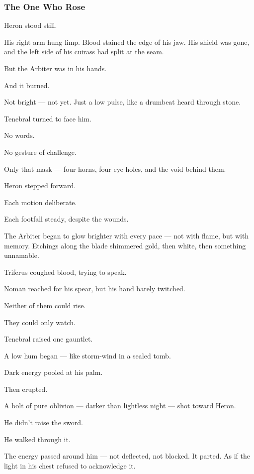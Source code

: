 \documentclass[12pt]{article}
\begin{document}
\dotfill

\subsubsection{The One Who Rose}

Heron stood still.

His right arm hung limp. Blood stained the edge of his jaw. His shield was gone, and the left side of his cuirass had split at the seam.

But the Arbiter was in his hands.

And it burned.

Not bright — not yet. Just a low pulse, like a drumbeat heard through stone.

\bigskip

Tenebral turned to face him.

No words.

No gesture of challenge.

Only that mask — four horns, four eye holes, and the void behind them.

Heron stepped forward.

Each motion deliberate.

Each footfall steady, despite the wounds.

The Arbiter began to glow brighter with every pace — not with flame, but with memory. Etchings along the blade shimmered gold, then white, then something unnamable.

Triferus coughed blood, trying to speak.

Noman reached for his spear, but his hand barely twitched.

Neither of them could rise.

They could only watch.

\bigskip

Tenebral raised one gauntlet.

A low hum began — like storm-wind in a sealed tomb.

Dark energy pooled at his palm.

Then erupted.

A bolt of pure oblivion — darker than lightless night — shot toward Heron.

He didn’t raise the sword.

He walked through it.

The energy passed around him — not deflected, not blocked. It parted. As if the light in his chest refused to acknowledge it.
\end{document}
